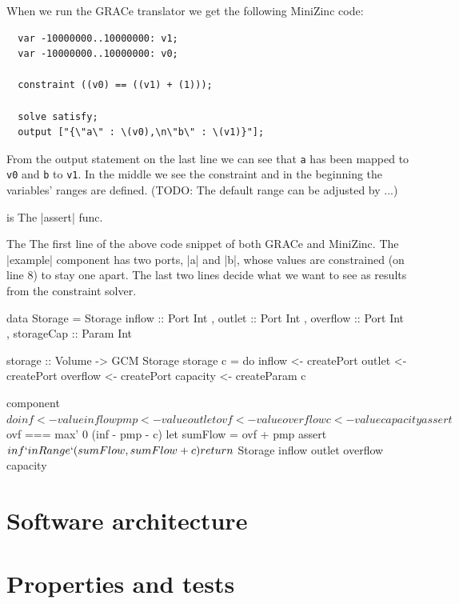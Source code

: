 \documentclass{article}
\begin{document}
When we run the GRACe translator we get the following MiniZinc code:
%
\begin{verbatim}
  var -10000000..10000000: v1;
  var -10000000..10000000: v0;

  constraint ((v0) == ((v1) + (1)));

  solve satisfy;
  output ["{\"a\" : \(v0),\n\"b\" : \(v1)}"];
\end{verbatim}
%
From the output statement on the last line we can see that \texttt{a} has
been mapped to \texttt{v0} and \texttt{b} to \texttt{v1}.
%
In the middle we see the constraint and in the beginning the
variables' ranges are defined.
%
(TODO: The default range can be adjusted by ...)



is The |assert| func. 

The The first line of the above code
snippet 
of both GRACe and
MiniZinc. The |example| component has two ports, |a| and |b|, whose values are
constrained (on line 8) to stay one apart. The last two lines decide what we
want to see as results from the constraint solver.

\begin{haskellcode}
data Storage = Storage
  { inflow     :: Port Int
  , outlet     :: Port Int
  , overflow   :: Port Int
  , storageCap :: Param Int
  }

storage :: Volume -> GCM Storage
storage c = do
  inflow   <- createPort
  outlet   <- createPort
  overflow <- createPort
  capacity <- createParam c

  component $ do
    inf <- value inflow
    pmp <- value outlet
    ovf <- value overflow
    c   <- value capacity
    assert $ ovf === max' 0 (inf - pmp - c)
    let sumFlow = ovf + pmp
    assert $ inf `inRange` (sumFlow, sumFlow + c)

  return $ Storage inflow outlet overflow capacity
\end{haskellcode}

\section{Software architecture}
\label{sec:architecture}




\section{Properties and tests}
\end{document}
